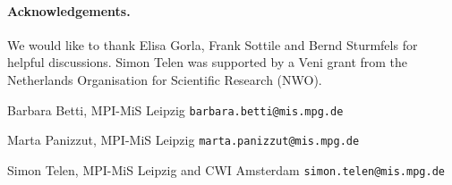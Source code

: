 \documentclass[12pt]{article}
\theoremstyle{definition}
\theoremstyle{remark}
\begin{document}
\paragraph{Acknowledgements.}
We would like to thank Elisa Gorla, Frank Sottile and Bernd Sturmfels for helpful discussions. Simon Telen was supported by a Veni grant from the Netherlands Organisation for Scientific Research (NWO).

\small



\medskip 

\medskip

\noindent Barbara Betti, MPI-MiS Leipzig \hfill{\tt barbara.betti@mis.mpg.de}

\noindent Marta Panizzut, MPI-MiS Leipzig \hfill{\tt marta.panizzut@mis.mpg.de}

\noindent Simon Telen, MPI-MiS Leipzig and CWI Amsterdam
\hfill {\tt simon.telen@mis.mpg.de}
\end{document}
